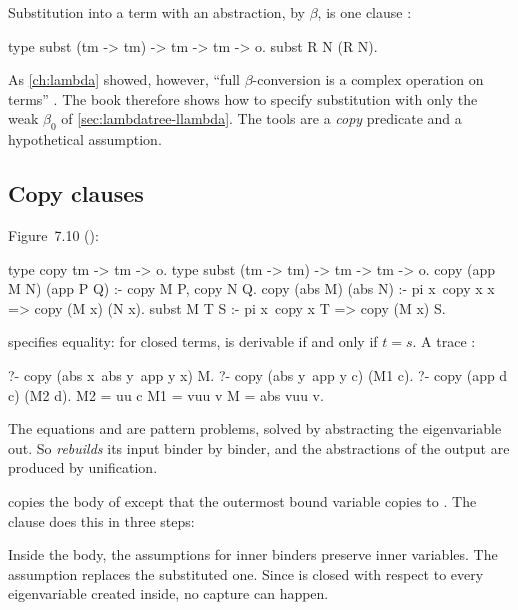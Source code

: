 {{{{{{Substitution into a term with an abstraction, by $\beta$, is one clause :
\begin{lprolog}
type subst (tm -> tm) -> tm -> tm -> o.
subst R N (R N).
\end{lprolog}
As \cref{ch:lambda} showed, however, \enquote{full $\beta$-conversion is a complex operation on terms} . The book therefore shows how to
specify substitution with only the weak $\beta_0$ of \cref{sec:lambdatree-llambda}. The tools are a
\emph{copy} predicate and a hypothetical assumption.

\subsection{Copy clauses}

Figure~7.10 ():
\begin{lprolog}
type copy   tm -> tm -> o.
type subst  (tm -> tm) -> tm -> tm -> o.
copy (app M N) (app P Q) :- copy M P, copy N Q.
copy (abs M) (abs N) :- pi x\ copy x x => copy (M x) (N x).
subst M T S :- pi x\ copy x T => copy (M x) S.
\end{lprolog}
 specifies equality: for closed terms,  is derivable if and only if $t=s$. A trace
:
\begin{lprolog}
?- copy (abs x\ abs y\ app y x) M.
?- copy (abs y\ app y c) (M1 c).
?- copy (app d c) (M2 d).
M2 = u\app u c
M1 = v\abs u\app u v
M  = abs v\abs u\app u v.
\end{lprolog}
The equations  and  are pattern problems, solved by abstracting
the eigenvariable out. So  \emph{rebuilds} its input binder by binder, and the abstractions of the output
are produced by unification.

\begin{tutorial}
 copies the body of  except that the outermost bound variable copies to  .
The clause does this in three steps:
\begin{enumerate}[nosep]
  \item the binder of  becomes a formula-level }}}}}
